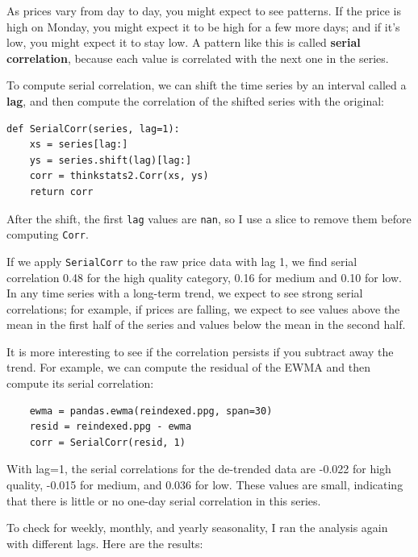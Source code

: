 \documentclass[12pt]{book}
\theoremstyle{exercise}
\begin{document}
As prices vary from day to day, you might expect to see patterns.
If the price is high on Monday,
you might expect it to be high for a few more days; and
if it's low, you might expect it to stay low.  A pattern
like this is called {\bf serial
correlation}, because each value is correlated with the next one
in the series.%
%

To compute serial correlation, we can shift the time series
by an interval called a {\bf lag}, and then compute the correlation
of the shifted series with the original:%

\begin{verbatim}
def SerialCorr(series, lag=1):
    xs = series[lag:]
    ys = series.shift(lag)[lag:]
    corr = thinkstats2.Corr(xs, ys)
    return corr
\end{verbatim}

After the shift, the first {\tt lag} values are {\tt nan}, so
I use a slice to remove them before computing {\tt Corr}.%


If we apply {\tt SerialCorr} to the raw price data with lag 1, we find
serial correlation 0.48 for the high quality category, 0.16 for
medium and 0.10 for low.  In any time series with a long-term trend,
we expect to see strong serial correlations; for example, if prices
are falling, we expect to see values above the mean in the first
half of the series and values below the mean in the second half.

It is more interesting to see if the correlation persists if you
subtract away the trend.  For example, we can compute the residual
of the EWMA and then compute its serial correlation:%

\begin{verbatim}
    ewma = pandas.ewma(reindexed.ppg, span=30)
    resid = reindexed.ppg - ewma
    corr = SerialCorr(resid, 1)
\end{verbatim}

With lag=1, the serial correlations for the de-trended data are
-0.022 for high quality, -0.015 for medium, and 0.036 for low.
These values are small, indicating that there is little or
no one-day serial correlation in this series.%

To check for weekly, monthly, and yearly seasonality, I ran
the analysis again with different lags.  Here are the results:%
\end{document}
